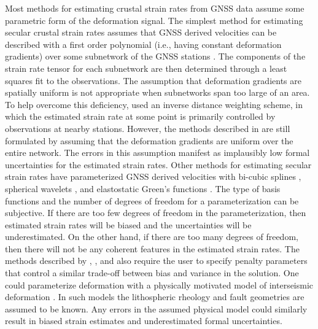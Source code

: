 \documentclass[10pt,letter]{article}
\begin{document}
Most methods for estimating crustal strain rates from GNSS data assume some parametric form of the deformation signal. The simplest method for estimating secular crustal strain rates assumes that GNSS derived velocities can be described with a first order polynomial (i.e., having constant deformation gradients) over some subnetwork of the GNSS stations \citep[e.g.,][]{Feigl1990,Murray2000}. The components of the strain rate tensor  for each subnetwork are then determined through a least squares fit to the observations. The assumption that deformation gradients are spatially uniform is not appropriate when subnetworks span too large of an area. To help overcome this deficiency, \citet{Shen1996,Shen2015} used an inverse distance weighting scheme, in which the estimated strain rate at some point is primarily controlled by observations at nearby stations. However, the methods described in \citet{Shen1996,Shen2015} are still formulated by assuming that the deformation gradients are uniform over the entire network. The errors in this assumption manifest as implausibly low formal uncertainties for the estimated strain rates. Other methods for estimating secular strain rates have parameterized GNSS derived velocities with bi-cubic splines \citep{Beavan2001}, spherical wavelets \citep{Tape2009}, and elastostatic Green's functions \citep{Sandwell2016}. The type of basis functions and the number of degrees of freedom for a parameterization can be subjective. If there are too few degrees of freedom in the parameterization, then estimated strain rates will be biased and the uncertainties will be underestimated. On the other hand, if there are too many degrees of freedom, then there will not be any coherent features in the estimated strain rates. The methods described by \citet{Beavan2001}, \citet{Tape2009}, and \citet{Sandwell2016} also require the user to specify penalty parameters that control a similar trade-off between bias and variance in the solution. One could parameterize deformation with a physically motivated model of interseismic deformation \citep[e.g.,][]{Meade2005,McCaffrey2007}. In such models the lithospheric rheology and fault geometries are assumed to be known. Any errors in the assumed physical model could similarly result in biased strain estimates and underestimated formal uncertainties. 
\end{document}
